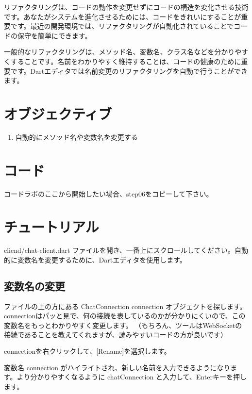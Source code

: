 
リファクタリングは、コードの動作を変更せずにコードの構造を変化させる技術です。あなたがシステムを進化させるためには、コードをきれいにすることが重要です。最近の開発環境では、リファクタリングが自動化されていることでコードの保守を簡単にできます。

一般的なリファクタリングは、メソッド名、変数名、クラス名などを分かりやすくすることです。名前をわかりやすく維持することは、コードの健康のために重要です。Dartエディタでは名前変更のリファクタリングを自動で行うことができます。

\section{オブジェクティブ}

\begin{enumerate}
\item 自動的にメソッド名や変数名を変更する
\end{enumerate}

\section{コード}

コードラボのここから開始したい場合、step06をコピーして下さい。

\section{チュートリアル}

cliend/chat-client.dart ファイルを開き、一番上にスクロールしてください。自動的に変数名を変更するために、Dartエディタを使用します。

\subsection{変数名の変更}

ファイルの上の方にある ChatConnection connection オブジェクトを探します。connectionはパッと見で、何の接続を表しているのかが分かりにくいので、この変数名をもっとわかりやすく変更します。
（もちろん、ツールはWebSocketの接続であることを教えてくれますが、読みやすいコードの方が良いです）

connectionを右クリックして、[Rename]を選択します。


変数名 connection がハイライトされ、新しい名前を入力できるようになります。より分かりやすくなるように chatConnection と入力して、Enterキーを押します。

